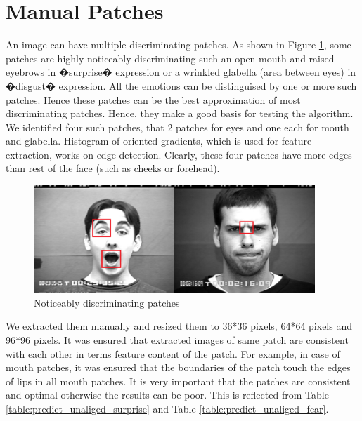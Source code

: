 
\section{Manual Patches}

An image can have multiple discriminating patches. As shown in Figure \ref{fig:manual_patch}, some patches are highly noticeably discriminating such an open mouth and raised eyebrows in �surprise� expression or a wrinkled glabella (area between eyes) in �disgust� expression. All the emotions can be distinguised by one or more such patches. Hence these patches can be the best approximation of most discriminating patches. Hence, they make a good basis for testing the algorithm.  We identified four such patches, that 2 patches for eyes and one each for mouth and glabella.  Histogram of oriented gradients, which is used for feature extraction, works on edge detection. Clearly, these four patches have more edges than rest of the face (such as cheeks or forehead).

\begin{figure}
\centering
\includegraphics[width=300pt]{manual_patch.png}
  \caption{Noticeably discriminating patches}
  \label{fig:manual_patch}
\end{figure}

We extracted them manually and resized them to 36*36 pixels, 64*64 pixels and 96*96 pixels. It was ensured that extracted images of same patch are consistent with each other in terms feature content of the patch. For example, in case of mouth patches, it was ensured that the boundaries of the patch touch the edges of lips in all mouth patches.  It is very important that the patches are consistent and optimal otherwise the results can be poor. This is reflected from Table \ref{table:predict_unaliged_surprise} and Table \ref{table:predict_unaliged_fear}.

